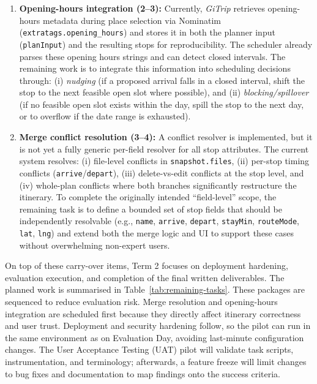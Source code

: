 \begin{enumerate}
  \item \textbf{Opening-hours integration (2--3):}
  Currently, \textit{GiTrip} retrieves opening-hours metadata during place selection via Nominatim
  (\texttt{extratags.opening\_hours}) and stores it in both the planner input (\texttt{planInput})
  and the resulting stops for reproducibility. The scheduler already parses these opening hours
  strings and can detect closed intervals. The remaining work is to integrate this information into
  scheduling decisions through: (i) \emph{nudging} (if a proposed arrival falls in a closed interval,
  shift the stop to the next feasible open slot where possible), and (ii) \emph{blocking/spillover}
  (if no feasible open slot exists within the day, spill the stop to the next day, or to overflow
  if the date range is exhausted).

  \item \textbf{Merge conflict resolution (3--4):}
  A conflict resolver is implemented, but it is not yet a fully generic per-field resolver for all
  stop attributes. The current system resolves: (i) file-level conflicts in \texttt{snapshot.files},
  (ii) per-stop timing conflicts (\texttt{arrive}/\texttt{depart}), (iii) delete-vs-edit conflicts at
  the stop level, and (iv) whole-plan conflicts where both branches significantly restructure the
  itinerary. To complete the originally intended ``field-level'' scope, the remaining task is to
  define a bounded set of stop fields that should be independently resolvable (e.g.,
  \texttt{name}, \texttt{arrive}, \texttt{depart}, \texttt{stayMin}, \texttt{routeMode}, \texttt{lat},
  \texttt{lng}) and extend both the merge logic and UI to support these cases without overwhelming
  non-expert users.
\end{enumerate}

On top of these carry-over items, Term 2 focuses on deployment hardening, evaluation execution,
and completion of the final written deliverables. The planned work is summarised in
Table~\ref{tab:remaining-tasks}. These packages are sequenced to reduce evaluation risk. Merge resolution and opening-hours integration are scheduled first because they directly affect itinerary correctness and user trust. Deployment and security hardening follow, so the pilot can run in the same environment as on Evaluation Day, avoiding last-minute configuration changes. The User Acceptance Testing (UAT) pilot will validate task scripts, instrumentation, and terminology; afterwards, a feature freeze will limit changes to bug fixes and documentation to map findings onto the success criteria.

